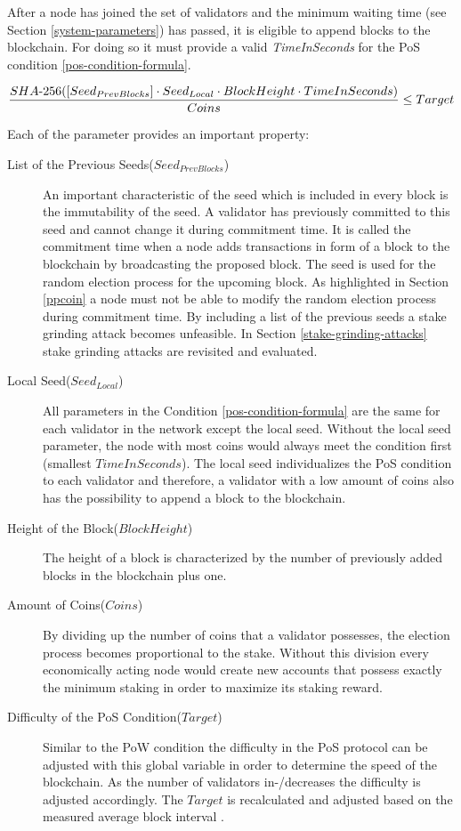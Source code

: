 After a node has joined the set of validators and the minimum waiting time (see Section \ref{system-parameters}) has passed, it is eligible to append blocks to the blockchain. For doing so it must provide a valid \textit{TimeInSeconds} for the PoS condition \ref{pos-condition-formula}. 

\begin{equation} 
\label{pos-condition-formula}
\frac{SHA{\text -}256([Seed_{PrevBlocks}] \cdot Seed_{Local} \cdot BlockHeight \cdot TimeInSeconds)}{Coins} \leq Target
\end{equation}

Each of the parameter provides an important property:
\begin{description}
	\item[List of the Previous Seeds($ Seed_{PrevBlocks} $)] An important characteristic of the seed which is included in every block is the immutability of the seed. A validator has previously committed to this seed and cannot change it during commitment time. It is called the commitment time when a node adds transactions in form of a block to the blockchain by broadcasting the proposed block. The seed is used for the random election process for the upcoming block. As highlighted in Section \ref{ppcoin} a node must not be able to modify the random election process during commitment time. 
	By including a list of the previous seeds a stake grinding attack becomes unfeasible. In Section \ref{stake-grinding-attacks} stake grinding attacks are revisited and evaluated.
	
	\item[Local Seed($ Seed_{Local} $)] All parameters in the Condition \ref{pos-condition-formula} are the same for each validator in the network except the local seed. Without the local seed parameter, the node with most coins would always meet the condition first (smallest $ TimeInSeconds $). The local seed individualizes the PoS condition to each validator and therefore, a validator with a low amount of coins also has the possibility to append a block to the blockchain. 
	
	\item[Height of the Block($ BlockHeight $)] The height of a block is characterized by the number of previously added blocks in the blockchain plus one.
	
	\item[Amount of Coins($ Coins $)] By dividing up the number of coins that a validator possesses, the election process becomes proportional to the stake. Without this division every economically acting node would create new accounts that possess exactly the minimum staking in order to maximize its staking reward.
	
	\item[Difficulty of the PoS Condition($ Target $)] Similar to the PoW condition \cite{bazo_paper} the difficulty in the PoS protocol can be adjusted with this global variable in order to determine the speed of the blockchain. As the number of validators in-/decreases the difficulty is adjusted accordingly. The $ Target $ is recalculated and adjusted based on the measured average block interval \cite{bazo_paper}.
\end{description}


